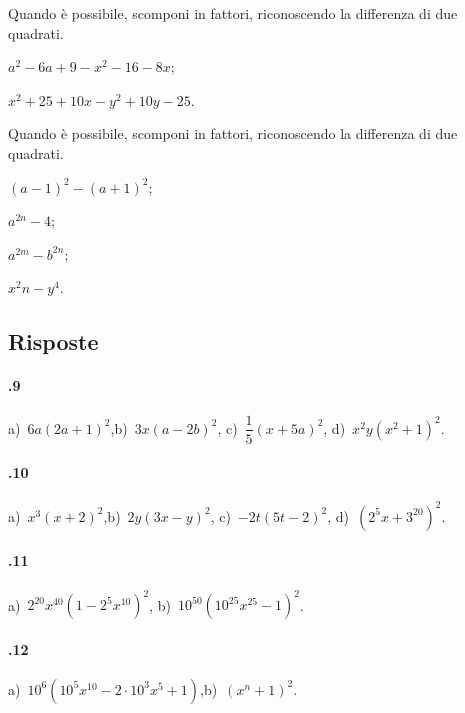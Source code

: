 \begin{multicols}{2}
\begin{esercizio}[\Ast]
\label{ese:16.41}
Quando è possibile, scomponi in fattori, riconoscendo la differenza di due quadrati.
\begin{enumeratea}
 \item $a^{2}-6a+9-x^{2}-16-8x$;
 \item $x^{2}+25+10x-y^{2}+10y-25$.
\end{enumeratea}
\end{esercizio}

\begin{esercizio}
\label{ese:16.42}
Quando è possibile, scomponi in fattori, riconoscendo la differenza di due quadrati.
\begin{enumeratea}
 \item $(a-1)^{2}-(a+1)^{2}$;
 \item $a^{2n}-4$;
 \item $a^{2m}-b^{2n}$;
 \item $x^{2}n-y^{4}$.
\end{enumeratea}
\end{esercizio}
\end{multicols}
\subsection{Risposte}

\paragraph{\thechapter.9}
a)~$6a(2a+1)^{2}$,\quad b)~$3x(a-2b)^{2}$, \quad c)~$\dfrac{1}{5}(x+5a)^{2}$, \quad d)~$x^{2}y\left(x^{2}+1\right)^{2}$.

\paragraph{\thechapter.10}
a)~$x^{3}(x+2)^{2}$,\quad b)~$2y(3x-y)^{2}$, \quad c)~$-2t(5t-2)^{2}$, \quad d)~$\left(2^{5}x+3^{20}\right)^{2}$.

\paragraph{\thechapter.11}
a)~$2^{20} x^{40}\left(1-2^{5}x^{10} \right)^2$, \quad b)~$10^{50}\left(10^{25} x^{25}-1 \right)^2$.

\paragraph{\thechapter.12}
a)~$10^{6} \left(10^{5} x^{10}-2 \cdot 10^{3}x^{5}+1\right)$,\quad b)~$\left(x^{n}+1\right)^2$.


